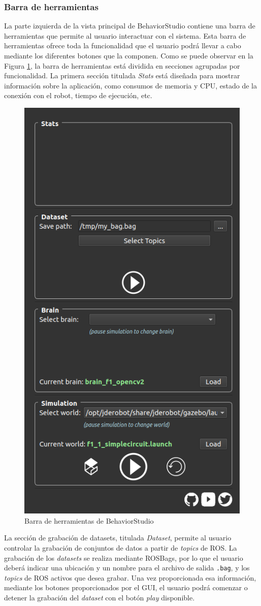 \subsubsection{Barra de herramientas}
\label{sec:toolbar}

La parte izquierda de la vista principal de BehaviorStudio contiene una barra de herramientas que permite al usuario interactuar con el sistema. Esta barra de herramientas ofrece toda la funcionalidad que el usuario podrá llevar a cabo mediante los diferentes botones que la componen. Como se puede observar en la Figura \ref{fig:toolbar}, la barra de herramientas está dividida en secciones agrupadas por funcionalidad. La primera sección titulada \textit{Stats} está diseñada para mostrar información sobre la aplicación, como consumos de memoria y CPU, estado de la conexión con el robot, tiempo de ejecución, etc.

\begin{figure}
  \centering
  \includegraphics[width=.4\linewidth]{img/toolbar}
  \caption{Barra de herramientas de BehaviorStudio}
  \label{fig:toolbar}
\end{figure}


La sección de grabación de datasets, titulada \textit{Dataset}, permite al usuario controlar la grabación de conjuntos de datos a partir de \textit{topics} de ROS. La grabación de los \textit{datasets} se realiza mediante ROSBags, por lo que el usuario deberá indicar una ubicación y un nombre para el archivo de salida \texttt{.bag}, y los \textit{topics} de ROS activos que desea grabar. Una vez proporcionada esa información, mediante los botones proporcionados por el GUI, el usuario podrá comenzar o detener la grabación del \textit{dataset} con el botón \textit{play} disponible.

